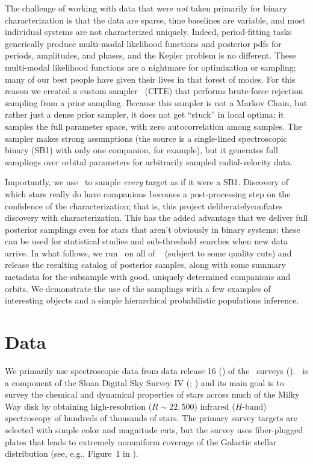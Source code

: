 \documentclass[modern]{aastex63}
\begin{document}
The challenge of working with data that were \emph{not} taken primarily for binary
characterization is that the data are sparse, time baselines are variable, and
most individual systems are not characterized uniquely.
Indeed, period-fitting tasks generically produce multi-modal likelihood functions
and posterior pdfs for periods, amplitudes, and phases, and the Kepler problem
is no different.
These multi-modal likelihood functions are a nightmare for optimization or sampling;
many of our best people have given their lives in that forest of modes.
For this reason we created a custom sampler \thejoker\ (CITE) that performs
brute-force rejection sampling from a prior sampling.
Because this sampler is not a Markov Chain, but rather just a dense prior sampler,
it does not get ``stuck'' in local optima; it samples the full parameter space,
with zero autocorrelation among samples.
The sampler makes strong assumptions (the source is a single-lined spectroscopic
binary (SB1) with only one companion, for example), but it
generates full samplings over orbital parameters for arbitrarily sampled
radial-velocity data.

Importantly, we use \thejoker\ to sample \emph{every} target as if it were a SB1.
Discovery of which stars really do have companions becomes a post-processing step
on the confidence of the characterization; that is, this project deliberatelyconflates
discovery with characterization.
This has the added advantage that we deliver full posterior samplings even for stars
that aren't obviously in binary systems; these can be used for statistical studies
and sub-threshold searches when new data arrive.
In what follows, we run \thejoker\ on all of \apogee\ 
(subject to some quality cuts) and release the
resulting catalog of posterior samples, along with some summary metadata for
the subsample with good, uniquely determined companions and orbits.
We demonstrate the use of the samplings with a few examples of interesting
objects and a simple hierarchical probabilistic populations inference.


\section{Data} \label{sec:data}

We primarily use spectroscopic data from data release 16 () of the
\apogee\ surveys (\citealt{Majewski:2017, DR16}).
\apogee\ is a component of the Sloan Digital Sky Survey IV (\sdssiv;
\citealt{Gunn:2006, Blanton:2017}) and its main goal is to survey the chemical
and dynamical properties of stars across much of the Milky Way disk by obtaining
high-resolution ($R \sim 22,500$) infrared ($H$-band) spectroscopy of hundreds
of thousands of stars.
The primary survey targets are selected with simple color and magnitude cuts,
but the survey uses fiber-plugged plates that leads to extremely nonuniform
coverage of the Galactic stellar distribution (see, e.g., Figure~1 in
\citealt{DR16}).
\end{document}
